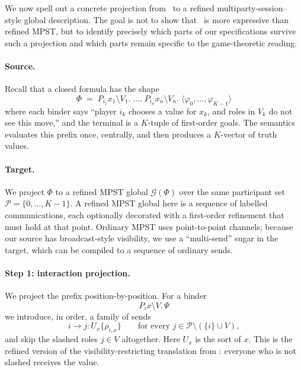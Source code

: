 We now spell out a concrete projection from \KFOL\ to a refined
multiparty-session--style global description. The goal is not to show that
\KFOL\ is more expressive than refined MPST, but to identify precisely which
parts of our specifications survive such a projection and which parts remain
specific to the game-theoretic reading.

\paragraph{Source.}
Recall that a closed \KFOL{} formula has the shape
\[
  \Phi \;=\; P_{i_1} x_1 \setminus V_1.\; \dots.\; P_{i_n} x_n \setminus V_n.\;
  \langle \varphi_0,\dots,\varphi_{K-1} \rangle
\]
where each binder says “player \(i_k\) chooses a value for \(x_k\), and roles in
\(V_k\) do not see this move,” and the terminal is a \(K\)-tuple of
first-order goals. The semantics evaluates this prefix once, centrally, and
then produces a \(K\)-vector of truth values.

\paragraph{Target.}
We project \(\Phi\) to a refined MPST global \(\mathcal{G}(\Phi)\) over the same
participant set \(\mathcal{P} = \{0,\dots,K-1\}\). A refined MPST global here is
a sequence of labelled communications, each optionally decorated with a
first-order refinement that must hold at that point. Ordinary MPST uses
point-to-point channels; because our source has broadcast-style visibility, we
use a “multi-send” sugar in the target, which can be compiled to a sequence of
ordinary sends.

\paragraph{Step 1: interaction projection.}
We project the prefix position-by-position. For a binder
\[
  P_i x \setminus V.\,\Psi
\]
we introduce, in order, a family of sends
\[
  i \to j : U_x \{ \rho_{i,x} \}
  \qquad \text{for every } j \in \mathcal{P} \setminus (\{i\} \cup V),
\]
and skip the slashed roles \(j \in V\) altogether. Here \(U_x\) is the sort of
\(x\). This is the refined version of the visibility-restricting translation
from : everyone who is not slashed receives the value.

